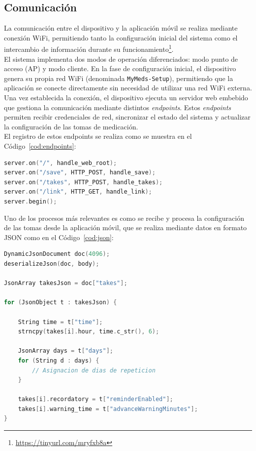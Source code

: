 \subsection{Comunicación}
\label{sec:comunicacion}

La comunicación entre el dispositivo y la aplicación móvil se realiza mediante conexión WiFi, permitiendo tanto la configuración inicial del sistema como el intercambio de información durante su funcionamiento\footnote{\url{https://tinyurl.com/mryfxb8a}}.\\

El sistema implementa dos modos de operación diferenciados: modo punto de acceso (AP) y modo cliente. En la fase de configuración inicial, el dispositivo genera su propia red WiFi (denominada \texttt{MyMeds-Setup}), permitiendo que la aplicación se conecte directamente sin necesidad de utilizar una red WiFi externa.\\

Una vez establecida la conexión, el dispositivo ejecuta un servidor web embebido que gestiona la comunicación mediante distintos \textit{endpoints}. Estos \textit{endpoints} permiten recibir credenciales de red, sincronizar el estado del sistema y actualizar la configuración de las tomas de medicación.\\

El registro de estos endpoints se realiza como se muestra en el Código~\ref{cod:endpoints}:

\begin{code}[H]
\begin{lstlisting}[language=C++]
server.on("/", handle_web_root);
server.on("/save", HTTP_POST, handle_save);
server.on("/takes", HTTP_POST, handle_takes);
server.on("/link", HTTP_GET, handle_link);
server.begin();
\end{lstlisting}
\caption{Registro de \textit{endpoints} en el servidor web embebido}
\label{cod:endpoints}
\end{code}

Uno de los procesos más relevantes es como se recibe y procesa la configuración de las tomas desde la aplicación móvil, que se realiza mediante datos en formato JSON como en el Código~\ref{cod:json}:

\begin{code}[H]
\begin{lstlisting}[language=C++]
DynamicJsonDocument doc(4096);
deserializeJson(doc, body);

JsonArray takesJson = doc["takes"];

for (JsonObject t : takesJson) {

    String time = t["time"];
    strncpy(takes[i].hour, time.c_str(), 6);

    JsonArray days = t["days"];
    for (String d : days) {
        // Asignacion de dias de repeticion
    }

    takes[i].recordatory = t["reminderEnabled"];
    takes[i].warning_time = t["advanceWarningMinutes"];
}
\end{lstlisting}
\caption{Procesamiento de datos JSON recibidos desde la aplicación}
\label{cod:json}
\end{code}

